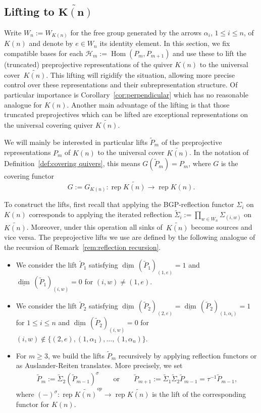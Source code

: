 \documentclass[smallextended,envcountsect,envcountsame]{svjour3}
\numberwithin{equation}{section}
\newcommand{\cH}{\mathcal{H}}
\newcommand\udim{{\underline{\dim}\, }}
\newcommand{\Hom}{\operatorname{Hom}}
\newcommand{\rep}{\operatorname{rep}}
\begin{document}
\subsection{Lifting to \texorpdfstring{$\mathbf{\widetilde{K(n)}}$}{K(n)}}
\label{Lifting}

Write $W_n:=W_{K(n)}$ for the free group generated by the arrows $\alpha_i$, $1\le i\le n$, of $K(n)$ and denote by $e\in W_n$ its identity element.
In this section, we fix compatible bases for each $\cH_m:=\Hom(P_m,P_{m+1})$ and use these to lift the (truncated) preprojective representations of the quiver $K(n)$ to the universal cover~$\widetilde{K(n)}$.
This lifting will rigidify the situation, allowing more precise control over these representations and their subrepresentation structure.
Of particular importance is Corollary~\ref{cor:perpendicular} which has no reasonable analogue for $K(n)$.
Another main advantage of the lifting is that those truncated preprojectives which can be lifted are exceptional representations on the universal covering quiver $\widetilde{K(n)}$.

We will mainly be interested in particular lifts $\tilde P_m$ of the preprojective representations $P_m$ of $K(n)$ to the universal cover $\widetilde{K(n)}$.
In the notation of Definition~\ref{def:covering quivers}, this means $G(\tilde P_m)=P_m$, where $G$ is the covering functor 
\[G:=G_{K(n)}:\rep\widetilde{K(n)}\to\rep K(n).\]

To construct the lifts, first recall that applying the BGP-reflection functor $\Sigma_i$ on $K(n)$ corresponds to applying the iterated reflection $\tilde\Sigma_i:=\prod_{w\in W_n}\Sigma_{(i,w)}$ on $\widetilde{K(n)}$.
Moreover, under this operation all sinks of~$\widetilde{K(n)}$ become sources and vice versa.
The preprojective lifts we use are defined by the following analogue of the recursion of Remark~\ref{rem:reflection recursion}.
\begin{itemize}
  \item We consider the lift $\tilde P_1$ satisfying $\udim(\tilde P_1)_{(1,e)}=1$ and $\udim(\tilde P_1)_{(i,w)}=0$ for $(i,w)\neq (1,e)$.
  \item We consider the lift $\tilde P_2$ satisfying $\udim(\tilde P_2)_{(2,e)}=\udim(\tilde P_2)_{(1,\alpha_i)}=1$ for $1\le i\le n$ and $\udim(\tilde P_2)_{(i,w)}=0$ for $(i,w)\notin\{(2,e),(1,\alpha_1),\ldots,(1,\alpha_n)\}$.
  \item For $m\geq 3$, we build the lifts $\tilde P_m$ recursively by applying reflection functors or as Auslander-Reiten translates.
    More precisely, we set
    \begin{align}
      \label{eq:recursive covers}
      \tilde P_m:=\tilde\Sigma_2(\tilde P_{m-1})^{\sigma}\qquad\text{or}\qquad\tilde P_{m+1}:=\tilde\Sigma_{1}\tilde\Sigma_2\tilde P_{m-1}=\tau^{-1} \tilde P_{m-1},
    \end{align}
    where $(-)^\sigma:\rep\widetilde{K(n)}^{op}\to\rep\widetilde{K(n)}$ is the lift of the corresponding functor for $K(n)$.
\end{itemize}
\end{document}
